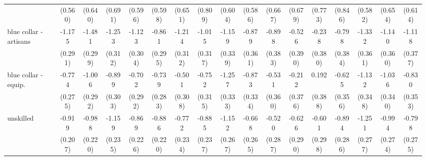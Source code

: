 {\begin{tabular}{l*{16}{c}}
                    &     (0.560)         &     (0.640)         &     (0.691)         &     (0.596)         &     (0.598)         &     (0.651)         &     (0.809)         &     (0.604)         &     (0.586)         &     (0.667)         &     (0.679)         &     (0.773)         &     (0.846)         &     (0.582)         &     (0.654)         &     (0.614)         \\
[1em]
blue collar - artisans&      -1.175\sym{***}&      -1.481\sym{***}&      -1.253\sym{***}&      -1.123\sym{***}&      -0.861\sym{**} &      -1.214\sym{***}&      -1.015\sym{**} &      -1.159\sym{***}&      -0.879\sym{*}  &      -0.898\sym{*}  &      -0.526         &      -0.238         &      -0.798\sym{*}  &      -1.332\sym{***}&      -1.140\sym{**} &      -1.118\sym{**} \\
                    &     (0.291)         &     (0.299)         &     (0.312)         &     (0.304)         &     (0.295)         &     (0.312)         &     (0.317)         &     (0.339)         &     (0.361)         &     (0.383)         &     (0.390)         &     (0.380)         &     (0.384)         &     (0.361)         &     (0.360)         &     (0.377)         \\
[1em]
blue collar - equip.&      -0.774\sym{**} &      -1.006\sym{***}&      -0.899\sym{**} &      -0.702\sym{*}  &      -0.739\sym{**} &      -0.501         &      -0.752\sym{*}  &      -1.257\sym{***}&      -0.873\sym{**} &      -0.531         &      -0.212         &       0.192         &      -0.625         &      -1.132\sym{**} &      -1.036\sym{**} &      -0.830\sym{*}  \\
                    &     (0.275)         &     (0.292)         &     (0.303)         &     (0.292)         &     (0.283)         &     (0.308)         &     (0.315)         &     (0.333)         &     (0.334)         &     (0.360)         &     (0.376)         &     (0.388)         &     (0.356)         &     (0.348)         &     (0.340)         &     (0.353)         \\
[1em]
unskilled           &      -0.919\sym{***}&      -0.988\sym{***}&      -1.159\sym{***}&      -0.869\sym{***}&      -0.886\sym{***}&      -0.772\sym{***}&      -0.885\sym{***}&      -1.152\sym{***}&      -0.668\sym{*}  &      -0.520         &      -0.626\sym{*}  &      -0.601\sym{*}  &      -0.894\sym{**} &      -1.251\sym{***}&      -0.994\sym{***}&      -0.798\sym{**} \\
                    &     (0.207)         &     (0.220)         &     (0.235)         &     (0.226)         &     (0.220)         &     (0.234)         &     (0.237)         &     (0.267)         &     (0.265)         &     (0.287)         &     (0.290)         &     (0.298)         &     (0.286)         &     (0.277)         &     (0.274)         &     (0.275)         \\

\end{tabular}}
